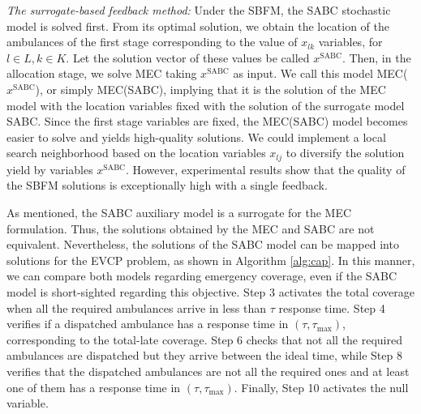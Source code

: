 \textit{The surrogate-based feedback method:} Under the SBFM,
the SABC stochastic model is solved first.
From its optimal solution, we obtain the location of the ambulances of the first stage corresponding to the value of $x_{lk}$ variables, for $l\in L, k \in K$. Let the solution vector of these values be called $x^\text{SABC}$. 
Then, in the allocation stage, we solve MEC 
taking $x^\text{SABC}$ as input. We call this
model MEC($x^\text{SABC}$), or simply MEC(SABC), implying
that it is the solution of the MEC model with the location variables fixed with the solution of the surrogate model SABC.
Since the first stage variables are fixed, the MEC(SABC) model becomes easier to solve and yields high-quality solutions. We could implement a local search neighborhood based on the location variables $x_{lj}$ to diversify the solution yield by variables $x^\text{SABC}$. However, experimental results show that the quality of the SBFM solutions is exceptionally high with a single feedback.  

As mentioned, the SABC auxiliary model is a surrogate for the MEC formulation. Thus, the solutions obtained by the MEC and SABC are not equivalent. Nevertheless, the solutions of the SABC model can be mapped into solutions for the EVCP problem, as shown in Algorithm \ref{alg:cap}. In this manner, we can compare both models regarding emergency coverage, even if the SABC model is short-sighted regarding this objective. 
Step 3 activates the total coverage when all the required ambulances arrive in less than $\tau$ response time. Step 4 verifies if a dispatched ambulance has a response time in $(\tau,\tau_{\max})$, corresponding to the total-late coverage. Step 6 checks that not all the required ambulances are dispatched but they arrive between the ideal time, while Step 8 verifies that the dispatched ambulances are not all the required ones and at least one of them has a response time in $(\tau,\tau_{\max})$. Finally, Step 10 activates the null variable.


